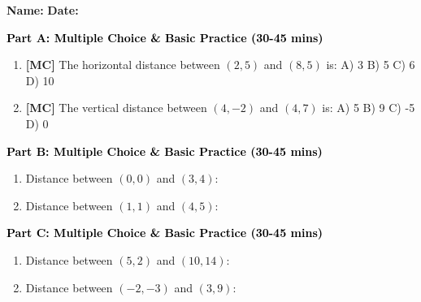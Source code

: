 \documentclass[12pt, letterpaper, fleqn]{article}
\newcommand{\blank}{\underline{\hspace{2.2cm}}}
\begin{document}
\textbf{Name:} \underline{\hspace{5cm}}
\hfill
\textbf{Date:} \underline{\hspace{3cm}}\\


\begin{tcolorbox}[colback=customteal!20]
\large\textcolor{black}{\textbf{Part A: Multiple Choice \& Basic Practice (30-45 mins)}}
\end{tcolorbox}

\vspace{3mm}

\begin{enumerate}[itemsep=2.5cm, leftmargin=0.6cm]
\item \textbf{[MC]} The horizontal distance between $(2, 5)$ and $(8, 5)$ is:
A) 3 B) 5 C) 6 D) 10
\item \textbf{[MC]} The vertical distance between $(4, -2)$ and $(4, 7)$ is:
A) 5 B) 9 C) -5 D) 0
\end{enumerate}

\newpage

\begin{tcolorbox}[colback=customteal!20]
\large\textcolor{black}{\textbf{Part B: Multiple Choice \& Basic Practice (30-45 mins)}}
\end{tcolorbox}

\vspace{3mm}

\begin{enumerate}[itemsep=2.5cm, leftmargin=0.6cm, resume]
\item Distance between $(0,0)$ and $(3,4)$: \blank
\item Distance between $(1,1)$ and $(4,5)$: \blank
\end{enumerate}

\newpage

\begin{tcolorbox}[colback=customteal!20]
\large\textcolor{black}{\textbf{Part C: Multiple Choice \& Basic Practice (30-45 mins)}}
\end{tcolorbox}

\vspace{3mm}

\begin{enumerate}[itemsep=2.5cm, leftmargin=0.6cm, resume]
\item Distance between $(5,2)$ and $(10,14)$: \blank
\item Distance between $(-2,-3)$ and $(3,9)$: \blank
\end{enumerate}
\end{document}
